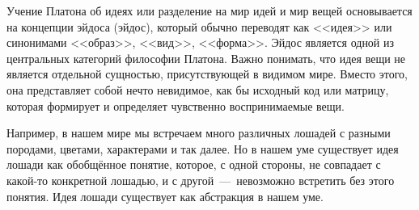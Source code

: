
Учение Платона об идеях или разделение на мир идей и мир вещей основывается на концепции эйдоса (эйдос), который обычно переводят как <<идея>> или синонимами <<образ>>, <<вид>>, <<форма>>. Эйдос является одной из центральных категорий философии Платона. Важно понимать, что идея вещи не является отдельной сущностью, присутствующей в видимом мире. Вместо этого, она представляет собой нечто невидимое, как бы исходный код или матрицу, которая формирует и определяет чувственно воспринимаемые вещи.

Например, в нашем мире мы встречаем много различных лошадей с разными породами, цветами, характерами и так далее. Но в нашем уме существует идея лошади как обобщённое понятие, которое, с одной стороны, не совпадает с какой-то конкретной лошадью, и с другой~---~невозможно встретить без этого понятия. Идея лошади существует как абстракция в нашем уме.



